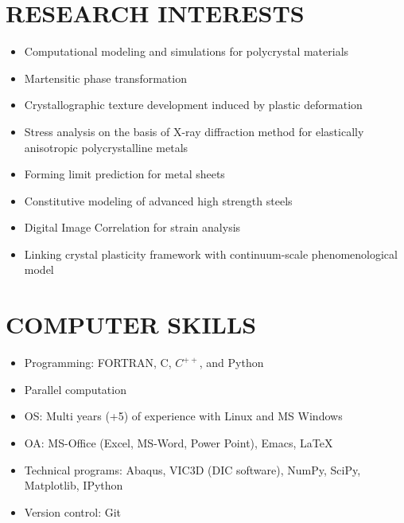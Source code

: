 \documentclass{res}
\begin{document}
\begin{resume}
  \section{RESEARCH INTERESTS}
  \begin{itemize}
  \item Computational modeling and simulations for polycrystal materials
  \item Martensitic phase transformation
  \item Crystallographic texture development induced by plastic deformation
  \item Stress analysis on the basis of X-ray diffraction method for elastically anisotropic polycrystalline metals
  \item Forming limit prediction for metal sheets
  \item Constitutive modeling of advanced high strength steels
  \item Digital Image Correlation for strain analysis
  \item Linking crystal plasticity framework with continuum-scale phenomenological model
  \end{itemize}


  \section{COMPUTER SKILLS}
  \begin{itemize}
  \item Programming: FORTRAN, C, $C^{++}$, and Python
  \item Parallel computation
  \item OS: Multi years (+5) of experience with Linux and MS Windows
  \item OA: MS-Office (Excel, MS-Word, Power Point), Emacs, \LaTeX
  \item Technical programs: Abaqus, VIC3D (DIC software), NumPy, SciPy, Matplotlib, IPython
  \item Version control: Git
  \end{itemize}
  


\end{resume}
\end{document}
